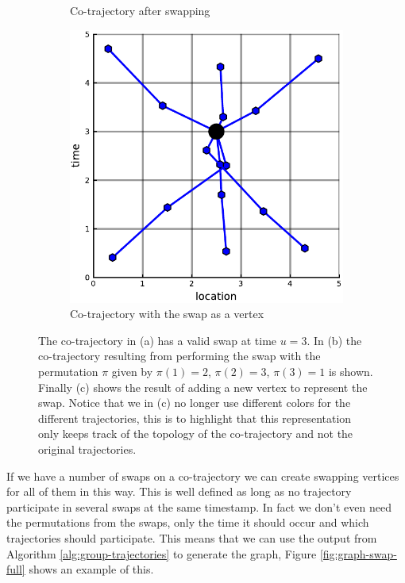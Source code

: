 \documentclass[12pt]{article}
\newcommand{\swaptime}{u}
\theoremstyle{definition}
\begin{document}
\begin{figure}
\begin{subfigure}[t]{0.3\textwidth}
      \caption{Co-trajectory after swapping}
      \label{fig:graph-swap-b}
    \end{subfigure}
    \begin{subfigure}[t]{0.3\textwidth}
      \includegraphics[width=\textwidth]{graph_swap-c.pdf}
      \caption{Co-trajectory with the swap as a vertex}
      \label{fig:graph-swap-c}
    \end{subfigure}
    \caption{The co-trajectory in (a) has a valid swap at time
      \(\swaptime = 3\). In (b) the co-trajectory resulting from
      performing the swap with the permutation \(\pi\) given by
      \(\pi(1) = 2\), \(\pi(2) = 3\), \(\pi(3) = 1\) is shown. Finally
      (c) shows the result of adding a new vertex to represent the
      swap. Notice that we in (c) no longer use different colors for
      the different trajectories, this is to highlight that this
      representation only keeps track of the topology of the
      co-trajectory and not the original trajectories.}
    \label{fig:graph-swap}
\end{figure}

If we have a number of swaps on a co-trajectory we can create swapping
vertices for all of them in this way. This is well defined as long as
no trajectory participate in several swaps at the same timestamp. In
fact we don't even need the permutations from the swaps, only the time
it should occur and which trajectories should participate. This means
that we can use the output from Algorithm \ref{alg:group-trajectories}
to generate the graph, Figure \ref{fig:graph-swap-full} shows an
example of this.
\end{document}
